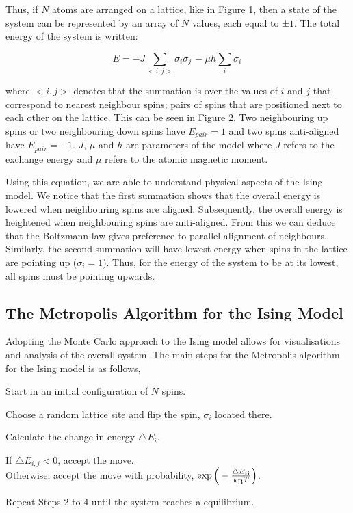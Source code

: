 \documentclass[a4paper]{article}
\begin{document}
Thus, if $N$ atoms are arranged on a lattice, like in Figure 1, then a state of the system can be represented by an array of $N$ values, each equal to ±$1$.
The total energy of the system is written:

\begin{equation}
E = -J\sum_{<i,j>} \sigma_{i}\sigma_{j} \, - \mu h\sum_{i} \sigma_{i} \,
\end{equation}

where $<i,j>$ denotes that the summation is over the values of $i$ and $j$ that correspond to nearest neighbour spins; pairs of spins that are positioned next to each other on the lattice. This can be seen in Figure 2. Two neighbouring up spins or two neighbouring down spins have $E_{pair} = 1$ and two spins anti-aligned have $E_{pair} = -1$. $J$, $\mu$ and $h$ are parameters of the model where $J$ refers to the exchange energy and $\mu$ refers to the atomic magnetic moment.

Using this equation, we are able to understand physical aspects of the Ising model. We notice that the first summation shows that the overall energy is lowered when neighbouring spins are aligned. Subsequently, the overall energy is heightened when neighbouring spins are anti-aligned. From this we can deduce that the Boltzmann law gives preference to parallel alignment of neighbours. Similarly, the second summation will have lowest energy when spins in the lattice are pointing up ($\sigma_{i} = 1$). Thus, for the energy of the system to be at its lowest, all spins must be pointing upwards. 

\subsection{The Metropolis Algorithm for the Ising Model}

Adopting the Monte Carlo approach to the Ising model allows for visualisations and analysis of the overall system. The main steps for the Metropolis algorithm for the Ising model is as follows,

\begin{description}[font=$\bullet$~\normalfont\scshape]
\item [Step 1] Start in an initial configuration of $N$ spins.
\item [Step 2] Choose a random lattice site and flip the spin, $\sigma_{i}$ located there.
\item [Step 3] Calculate the change in energy $\triangle{E_{i}}$.
\item [Step 4] If $\triangle{E_{i,j}} < 0$, accept the move. \\ Otherwise, accept the move with probability, $\exp \Big( - \frac{\triangle{E_{i}}\textsubscript{i}}{k\textsubscript{B} T}\Big)$.
\item [Step 5] Repeat Steps 2 to 4 until the system reaches a equilibrium.
\end{description}
\end{document}
